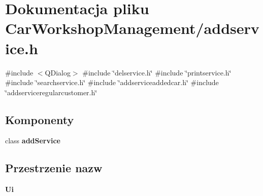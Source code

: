 \section{Dokumentacja pliku Car\+Workshop\+Management/addservice.h}
\label{addservice_8h}
{\ttfamily \#include $<$Q\+Dialog$>$}\newline
{\ttfamily \#include \char`\"{}delservice.\+h\char`\"{}}\newline
{\ttfamily \#include \char`\"{}printservice.\+h\char`\"{}}\newline
{\ttfamily \#include \char`\"{}searchservice.\+h\char`\"{}}\newline
{\ttfamily \#include \char`\"{}addserviceaddedcar.\+h\char`\"{}}\newline
{\ttfamily \#include \char`\"{}addserviceregularcustomer.\+h\char`\"{}}\newline
\subsection*{Komponenty}
\begin{DoxyCompactItemize}
\item 
class \textbf{ add\+Service}
\end{DoxyCompactItemize}
\subsection*{Przestrzenie nazw}
\begin{DoxyCompactItemize}
\item 
 \textbf{ Ui}
\end{DoxyCompactItemize}
